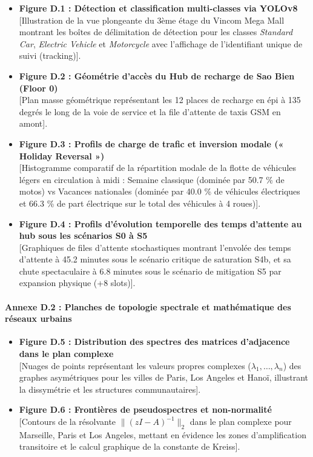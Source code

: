 \documentclass[11pt, a4paper]{article}
\providecommand{\tightlist}{}
\begin{document}
\begin{itemize}
\tightlist
\item
  \textbf{Figure D.1 : Détection et classification multi-classes via
  YOLOv8}\\
  {[}Illustration de la vue plongeante du 3ème étage du Vincom Mega Mall
  montrant les boîtes de délimitation de détection pour les classes
  \emph{Standard Car}, \emph{Electric Vehicle} et \emph{Motorcycle} avec
  l'affichage de l'identifiant unique de suivi (tracking){]}.
\item
  \textbf{Figure D.2 : Géométrie d'accès du Hub de recharge de Sao Bien
  (Floor 0)}\\
  {[}Plan masse géométrique représentant les 12 places de recharge en
  épi à 135 degrés le long de la voie de service et la file d'attente de
  taxis GSM en amont{]}.
\item
  \textbf{Figure D.3 : Profils de charge de trafic et inversion modale
  (« Holiday Reversal »)}\\
  {[}Histogramme comparatif de la répartition modale de la flotte de
  véhicules légers en circulation à midi : Semaine classique (dominée
  par 50.7 \% de motos) vs Vacances nationales (dominée par 40.0 \% de
  véhicules électriques et 66.3 \% de part électrique sur le total des
  véhicules à 4 roues){]}.
\item
  \textbf{Figure D.4 : Profils d'évolution temporelle des temps
  d'attente au hub sous les scénarios S0 à S5}\\
  {[}Graphiques de files d'attente stochastiques montrant l'envolée des
  temps d'attente à 45.2 minutes sous le scénario critique de saturation
  S4b, et sa chute spectaculaire à 6.8 minutes sous le scénario de
  mitigation S5 par expansion physique (+8 slots){]}.
\end{itemize}

\paragraph{Annexe D.2 : Planches de topologie spectrale et mathématique
des réseaux
urbains}\label{annexe-d.2-planches-de-topologie-spectrale-et-mathuxe9matique-des-ruxe9seaux-urbains}

\begin{itemize}
\tightlist
\item
  \textbf{Figure D.5 : Distribution des spectres des matrices
  d'adjacence dans le plan complexe}\\
  {[}Nuages de points représentant les valeurs propres complexes
  (\(\lambda_1, \dots, \lambda_n\)) des graphes asymétriques pour les
  villes de Paris, Los Angeles et Hanoï, illustrant la dissymétrie et
  les structures communautaires{]}.
\item
  \textbf{Figure D.6 : Frontières de pseudospectres et non-normalité}\\
  {[}Contours de la résolvante \(\|(zI - A)^{-1}\|_2\) dans le plan
  complexe pour Marseille, Paris et Los Angeles, mettant en évidence les
  zones d'amplification transitoire et le calcul graphique de la
  constante de Kreiss{]}.
\end{itemize}
\end{document}
